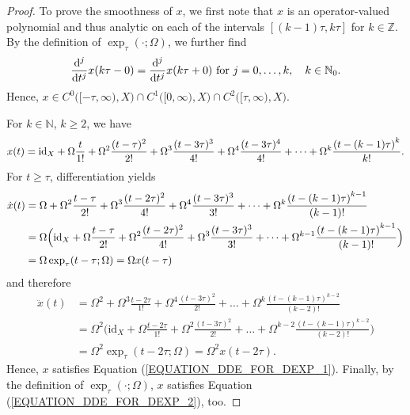 \documentclass[12pt]{article}
\numberwithin{equation}{section}
\numberwithin{equation}{section}
\begin{document}
	\begin{proof}
		To prove the smoothness of $x$, we first note that
		$x$ is an operator-valued polynomial and thus analytic on each of the intervals $[(k - 1) \tau, k \tau]$ for $k \in \mathbb{Z}$.
		By the definition of $\exp_{\tau}(\cdot; \Omega)$, we further find
		\begin{equation}
			\frac{\mathrm{d}^{j}}{\mathrm{d} t^{j}} x(k\tau - 0) = \frac{\mathrm{d}^{j}}{\mathrm{d} t^{j}} x(k\tau + 0) \text{ for } j = 0, \dots, k, \quad k \in \mathbb{N}_{0}. \notag
		\end{equation}
		Hence, $x \in C^{0}\big([-\tau, \infty), X\big) \cap C^{1}\big([0, \infty), X\big) \cap C^{2}\big([\tau, \infty), X\big)$.

		For $k \in \mathbb{N}$, $k \geq 2$, we have
		\begin{equation}
			x(t) = \mathrm{id}_{X} + \Omega \frac{t}{1!} + \Omega^{2} \frac{(t - \tau)^{2}}{2!} + \Omega^{3} \frac{(t - 3\tau)^{3}}{4!} +
			\Omega^{4} \frac{(t - 3\tau)^{4}}{4!} + \dots +
			\Omega^{k} \frac{\left(t - (k - 1) \tau\right)^{k}}{k!}. \notag
		\end{equation}
		For $t \geq \tau$, differentiation yields
		\begin{align*}
			\dot{x}(t) &=
			\Omega + \Omega^{2} \frac{t - \tau}{2!} + \Omega^{3} \frac{(t - 2\tau)^{2}}{4!} + \Omega^{4} \frac{(t - 3\tau)^{3}}{3!} + \dots +
			\Omega^{k} \frac{\left(t - (k - 1) \tau\right)^{k-1}}{(k - 1)!} \\
						&= \Omega \Big(
			\mathrm{id}_{X} + \Omega \frac{t - \tau}{2!} + \Omega^{2} \frac{(t - 2\tau)^{2}}{4!} + \Omega^{3} \frac{(t - 3\tau)^{3}}{3!} + \dots +
			\Omega^{k-1} \frac{\left(t - (k - 1) \tau\right)^{k-1}}{(k - 1)!}\Big) \\
			&= \Omega \exp_{\tau}(t - \tau; \Omega) = \Omega x(t - \tau) \notag
		\end{align*}
		and therefore
		\begin{align*}
			\ddot{x}(t) &= \Omega^{2} +
			\Omega^{3} \frac{t - 2\tau}{1!} + \Omega^{4} \frac{(t - 3\tau)^{2}}{2!} + \dots +
			\Omega^{k} \frac{\left(t - (k - 1) \tau\right)^{k-2}}{(k - 2)!} \\
						&= \Omega^{2} \Big(
			\mathrm{id}_{X} + \Omega \frac{t - 2\tau}{1!} + \Omega^{2} \frac{(t - 3\tau)^{2}}{2!} + \dots +
			\Omega^{k-2} \frac{\left(t - (k - 1) \tau\right)^{k-2}}{(k - 2)!}\Big) \\
			&= \Omega^{2} \exp_{\tau}(t - 2\tau; \Omega) = \Omega^{2} x(t - 2\tau).
		\end{align*}
		Hence, $x$ satisfies Equation (\ref{EQUATION_DDE_FOR_DEXP_1}).
		Finally, by the definition of $\exp_{\tau}(\cdot; \Omega)$,
		$x$ satisfies Equation (\ref{EQUATION_DDE_FOR_DEXP_2}), too.
	\end{proof}
\end{document}
